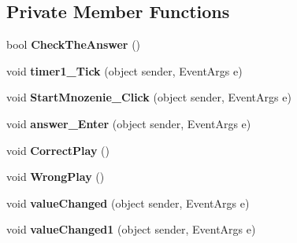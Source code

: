 \subsection*{Private Member Functions}
\begin{DoxyCompactItemize}
\item 
\mbox{\label{class_quiz___matematyczny_1_1_mnozenie_a33a62ef75d49f24edbfb809b8386d4d1}} 
bool {\bfseries Check\+The\+Answer} ()
\item 
\mbox{\label{class_quiz___matematyczny_1_1_mnozenie_a0e1ab173105492b8fa8e9192c33524d2}} 
void {\bfseries timer1\+\_\+\+Tick} (object sender, Event\+Args e)
\item 
\mbox{\label{class_quiz___matematyczny_1_1_mnozenie_aae5a839f47e2bfb64ad5d88701e9ceef}} 
void {\bfseries Start\+Mnozenie\+\_\+\+Click} (object sender, Event\+Args e)
\item 
\mbox{\label{class_quiz___matematyczny_1_1_mnozenie_a6c6ac04c6c5fa4a635d28e7158efb235}} 
void {\bfseries answer\+\_\+\+Enter} (object sender, Event\+Args e)
\item 
\mbox{\label{class_quiz___matematyczny_1_1_mnozenie_af727ab047f803524dc92cdfda56f3cfa}} 
void {\bfseries Correct\+Play} ()
\item 
\mbox{\label{class_quiz___matematyczny_1_1_mnozenie_a08c787f0a133508b57594d186dc0981e}} 
void {\bfseries Wrong\+Play} ()
\item 
\mbox{\label{class_quiz___matematyczny_1_1_mnozenie_af74c600f7be11c7ddd5f37e48acd5728}} 
void {\bfseries value\+Changed} (object sender, Event\+Args e)
\item 
\mbox{\label{class_quiz___matematyczny_1_1_mnozenie_a108dda4cf9d0867bb7b70025d787fe94}} 
void {\bfseries value\+Changed1} (object sender, Event\+Args e)
\item 
\mbox{\label{class_quiz___matematyczny_1_1_mnozenie_aa4e459830fca1243e41d35924fee5b1d}} 

\end{DoxyCompactItemize}

